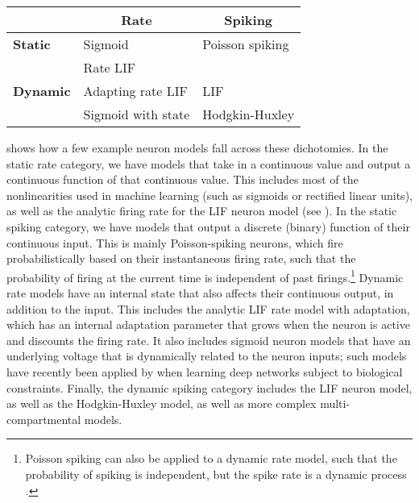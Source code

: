 \begin{table}
  \centering
  \begin{tabular}{l|l|l}
            & \multicolumn{1}{|c}{\textbf{Rate}}
            & \multicolumn{1}{|c}{\textbf{Spiking}} \\\hline
    \textbf{Static}
      & Sigmoid                   & Poisson spiking              \\
      & Rate LIF                  &                              \\\hline
    \textbf{Dynamic}
      & Adapting rate LIF         & LIF                          \\
      & Sigmoid with state        & Hodgkin-Huxley               \\
  \end{tabular}
\end{table}

 shows how a few example neuron models fall across
these dichotomies.
In the static rate category, we have models that take in
a continuous value and output a continuous function of that continuous value.
This includes most of the nonlinearities used in machine learning
(such as sigmoids or rectified linear units),
as well as the analytic firing rate for the LIF neuron model (see ).
In the static spiking category, we have models that output a discrete (binary)
function of their continuous input.
This is mainly Poisson-spiking neurons,
which fire probabilistically based on their instantaneous firing rate,
such that the probability of firing at the current time is
independent of past firings.\footnote{
  Poisson spiking can also be applied to a dynamic rate model,
  such that the probability of spiking is independent, but the spike rate is a
  dynamic process \parencite[\eg/][]{Lillicrap2016}.}
Dynamic rate models have an internal state that also affects their continuous output,
in addition to the input.
This includes the analytic LIF rate model with adaptation,
which has an internal adaptation parameter that grows when the neuron is active
and discounts the firing rate.
It also includes sigmoid neuron models that have an underlying voltage
that is dynamically related to the neuron inputs;
such models have recently been applied by \textcite{Guergiuev2017}
when learning deep networks subject to biological constraints.
Finally, the dynamic spiking category includes the LIF neuron model,
as well as the Hodgkin-Huxley model,
as well as more complex multi-compartmental models.

